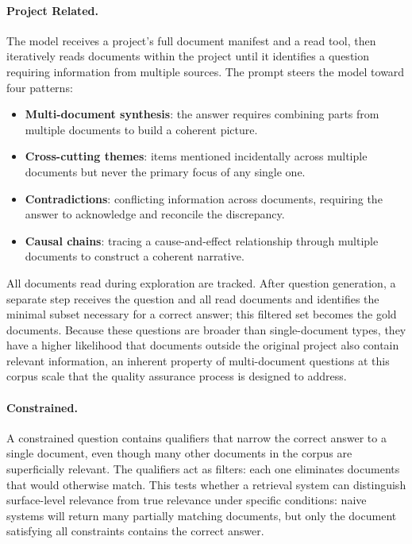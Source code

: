 \documentclass{article}
\begin{document}
\paragraph{Project Related.}
The model receives a project's full document manifest and a read tool, then iteratively reads documents within the project until it identifies a question requiring information from multiple sources. The prompt steers the model toward four patterns:

\begin{itemize}[leftmargin=2em]
  \item \textbf{Multi-document synthesis}: the answer requires combining parts from multiple documents to build a coherent picture.
  \item \textbf{Cross-cutting themes}: items mentioned incidentally across multiple documents but never the primary focus of any single one.
  \item \textbf{Contradictions}: conflicting information across documents, requiring the answer to acknowledge and reconcile the discrepancy.
  \item \textbf{Causal chains}: tracing a cause-and-effect relationship through multiple documents to construct a coherent narrative.
\end{itemize}

All documents read during exploration are tracked. After question generation, a separate step receives the question and all read documents and identifies the minimal subset necessary for a correct answer; this filtered set becomes the gold documents. Because these questions are broader than single-document types, they have a higher likelihood that documents outside the original project also contain relevant information, an inherent property of multi-document questions at this corpus scale that the quality assurance process is designed to address.

\paragraph{Constrained.}
A constrained question contains qualifiers that narrow the correct answer to a single document, even though many other documents in the corpus are superficially relevant. The qualifiers act as filters: each one eliminates documents that would otherwise match. This tests whether a retrieval system can distinguish surface-level relevance from true relevance under specific conditions: naive systems will return many partially matching documents, but only the document satisfying all constraints contains the correct answer.
\end{document}
